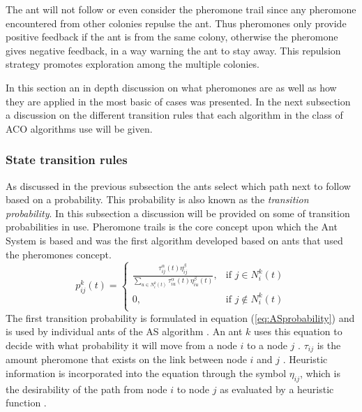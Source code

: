The ant will not follow or even consider the pheromone trail since any pheromone encountered from other colonies repulse the ant\cite{ACOLargeProblem}. Thus pheromones only provide positive feedback if the ant is from the same colony, otherwise the pheromone gives negative feedback, in a way warning the ant to stay away\cite{ACOLargeProblem}. This repulsion strategy promotes exploration among the multiple colonies\cite{ACOLargeProblem}.

In this section an in depth discussion on what pheromones are as well as how they are applied in the most basic of cases was presented. In the next subsection a discussion on the different transition rules that each algorithm in the class of ACO algorithms use will be given.
\subsubsection{State transition rules}
 As discussed in the previous subsection the ants select which path next to follow based on a probability. This probability is also known as the \emph{transition probability}. In this subsection a discussion will be provided on some of transition probabilities in use. Pheromone trails is the core concept upon which the Ant System is based and was the first algorithm developed based on ants that used the pheromones concept\cite{CompuIntelligenceIntro,ACOLargeProblem,AntQAP,FundamentalSwarm}. 
\begin{equation}
\label{eq:ASprobability}
p^k_{ij}(t) =
\begin{cases}
	\frac{\tau^{\alpha}_{ij}(t)\eta^{\beta}_{ij}}{\sum_{u \in N^k_i(t)} {\tau^{\alpha}_{iu}(t)\eta^{\beta}_{iu}(t)}}, &\text{if $j \in N^k_i(t)$}\\
	0, &\text{if $j \notin N^k_i(t)$}\\
\end{cases}
\end{equation}
The first transition probability is formulated in equation (\ref{eq:ASprobability}) and is used by individual ants of the AS algorithm \cite{CompuIntelligenceIntro,AntSurvey,ACOLargeProblem,AntQAP,FundamentalSwarm}. An ant $k$ uses this equation to decide with what probability it will move from a node $i$ to a node $j$ \cite{CompuIntelligenceIntro,ACOLargeProblem,AntQAP,FundamentalSwarm}. $\tau_{ij}$ is the amount pheromone that exists on the link between node $i$ and $j$ \cite{CompuIntelligenceIntro,AntsAndStigmergy,ACOLargeProblem,AntQAP,FundamentalSwarm}. Heuristic information is incorporated into the equation through the symbol $\eta_{ij}$, which is the desirability of the path from node $i$ to node $j$ as evaluated by a heuristic function \cite{CompuIntelligenceIntro,AntsAndStigmergy,ACOLargeProblem,AntQAP,FundamentalSwarm}. 

